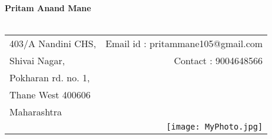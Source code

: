 \documentclass[12pt]{article}
\begin{document}
\begin{flushleft}
	
\hspace{65mm}
\textbf{Pritam Anand Mane}\\

\hrulefill
\vspace{3mm} \\

\begin{tabular}{l r}
  	403/A Nandini CHS, & \hspace{40mm} Email id : pritammane105@gmail.com \\
  	Shivai Nagar, & Contact : 9004648566\\ 
  	Pokharan rd. no. 1,\\ 
  	Thane West  400606 \\
  	Maharashtra  \\
  	 & \texttt{[image: MyPhoto.jpg]}
\end{tabular}
\end{flushleft}
\end{document}
